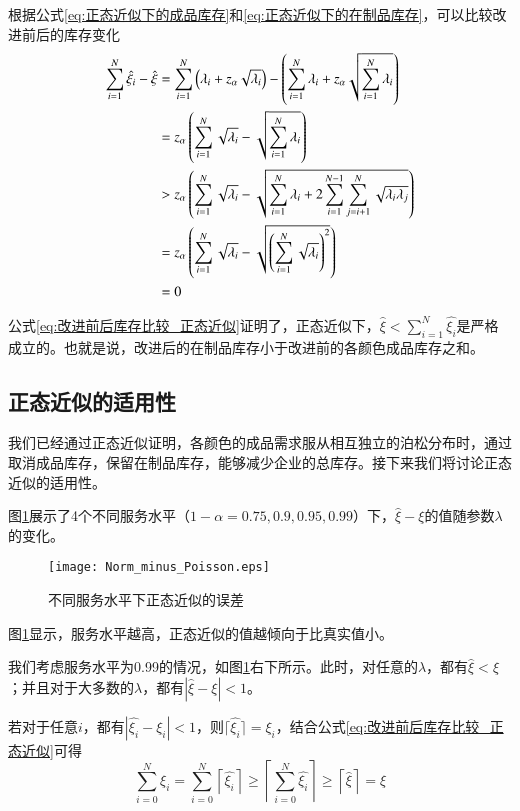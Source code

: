 根据公式\ref{eq:正态近似下的成品库存}和\ref{eq:正态近似下的在制品库存}，可以比较改进前后的库存变化
\begin{align}
\sum_{i=1}^N\hat{\xi_i} - \hat{\xi} &= \sum_{i=1}^N\left(\lambda_i + z_\alpha\sqrt{\lambda_i}\right) - \left(\sum_{i=1}^N\lambda_i + z_\alpha\sqrt{\sum_{i=1}^N\lambda_i}\right) \notag\\
&= z_\alpha\left(\sum_{i=1}^N\sqrt{\lambda_i}-\sqrt{\sum_{i=1}^N\lambda_i}\right) \notag\\
&> z_\alpha\left(\sum_{i=1}^N\sqrt{\lambda_i}-\sqrt{\sum_{i=1}^N\lambda_i+2\sum_{i=1}^{N-1}\sum_{j=i+1}^N\sqrt{\lambda_i\lambda_j}}\right) \notag\\
&= z_\alpha\left(\sum_{i=1}^N\sqrt{\lambda_i}-\sqrt{\left(\sum_{i=1}^N\sqrt{\lambda_i}\right)^2}\right) \notag\\
&=0
\label{eq:改进前后库存比较_正态近似}
\end{align}

公式\ref{eq:改进前后库存比较_正态近似}证明了，正态近似下，$\hat{\xi} < \sum_{i=1}^N\hat{\xi_i}$是严格成立的。也就是说，改进后的在制品库存小于改进前的各颜色成品库存之和。




\subsection{正态近似的适用性}

我们已经通过正态近似证明，各颜色的成品需求服从相互独立的泊松分布时，通过取消成品库存，保留在制品库存，能够减少企业的总库存。接下来我们将讨论正态近似的适用性。

图\ref{fig:正态近似的误差}展示了4个不同服务水平（$1-\alpha=0.75,0.9,0.95,0.99$）下，$\hat{\xi}-\xi$的值随参数$\lambda$的变化。

\begin{figure}[htb]
\centering
\texttt{[image: Norm\_minus\_Poisson.eps]}
\caption{不同服务水平下正态近似的误差}
\label{fig:正态近似的误差}
\end{figure}

图\ref{fig:正态近似的误差}显示，服务水平越高，正态近似的值越倾向于比真实值小。

我们考虑服务水平为0.99的情况，如图\ref{fig:正态近似的误差}右下所示。此时，对任意的$\lambda$，都有$\hat{\xi} < \xi$；并且对于大多数的$\lambda$，都有$|\hat{\xi} - \xi| < 1$。

若对于任意$i$，都有$|\hat{\xi_i}-\xi_i| < 1$，则$\lceil\hat{\xi_i}\rceil=\xi_i$，结合公式\ref{eq:改进前后库存比较_正态近似}可得
\begin{equation}
\sum_{i=0}^N \xi_i = \sum_{i=0}^N \left\lceil\hat{\xi_i}\right\rceil \geq \left\lceil\sum_{i=0}^N\hat{\xi_i}\right\rceil \geq \left\lceil\hat{\xi}\right\rceil = \xi
\end{equation}


